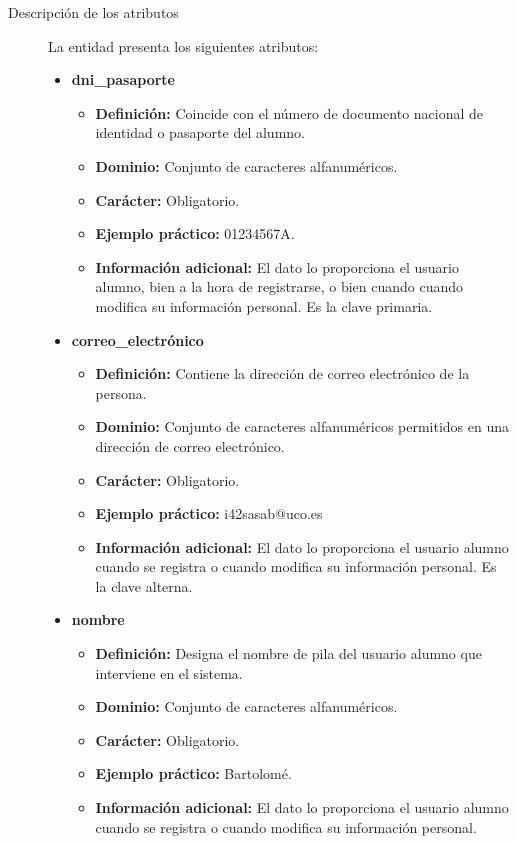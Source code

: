 \begin{description}
   \item[Descripción de los atributos] La entidad presenta los siguientes
   atributos:

   \begin{itemize}
   \item \textbf{dni\_pasaporte}
      \begin{itemize}
         \item \textbf{Definición:} Coincide con el número de documento nacional
         de identidad o pasaporte del alumno.
         \item \textbf{Dominio:} Conjunto de caracteres alfanuméricos.
         \item \textbf{Carácter:} Obligatorio.
         \item \textbf{Ejemplo práctico:} 01234567A.
         \item \textbf{Información adicional:} El dato lo proporciona el usuario alumno, bien a la hora de registrarse, o bien cuando cuando modifica su información personal. Es la clave primaria.
      \end{itemize}
   \item \textbf{correo\_electrónico}
      \begin{itemize}
         \item \textbf{Definición:} Contiene la dirección de correo electrónico de la persona.
         \item \textbf{Dominio:} Conjunto de caracteres alfanuméricos permitidos en una dirección de correo electrónico.
         \item \textbf{Carácter:} Obligatorio.
         \item \textbf{Ejemplo práctico:} i42sasab@uco.es
         \item \textbf{Información adicional:} El dato lo proporciona el usuario alumno cuando se registra o cuando modifica su información personal. Es la clave alterna.
      \end{itemize}
   \item \textbf{nombre}
      \begin{itemize}
         \item \textbf{Definición:} Designa el nombre de pila del usuario alumno que interviene en el sistema.
         \item \textbf{Dominio:} Conjunto de caracteres alfanuméricos.
         \item \textbf{Carácter:} Obligatorio.
         \item \textbf{Ejemplo práctico:} Bartolomé.
         \item \textbf{Información adicional:} El dato lo proporciona el usuario alumno cuando se registra o cuando modifica su información personal.

\end{itemize}
\end{itemize}
\end{description}
